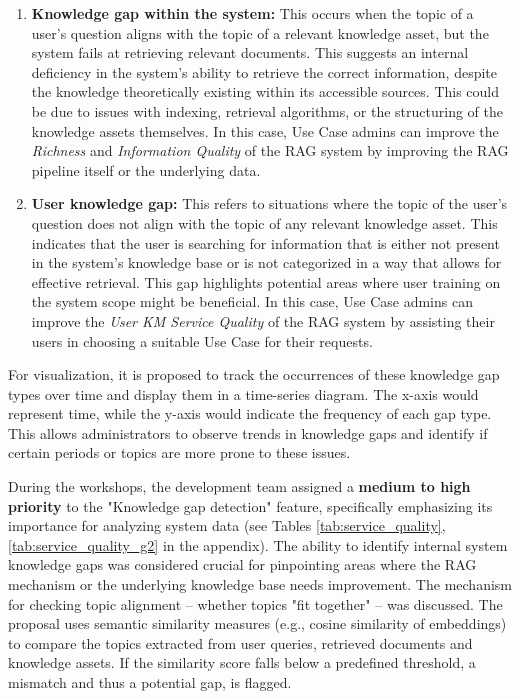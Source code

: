 \documentclass[
	english,
	ruledheaders=section,%
	class=report,%
	thesis={type=bachelor},%
	accentcolor=1b,%
	custommargins=true,%
	marginpar=false,%
	parskip=half-,%
	fontsize=11pt,%
	DIV=14,
]{tudapub}
\begin{document}
\begin{enumerate}
    \item \textbf{Knowledge gap within the system:} This occurs when the topic of a user's question aligns with the topic of a relevant knowledge asset, but the system fails at retrieving relevant documents. This suggests an internal deficiency in the system's ability to retrieve the correct information, despite the knowledge theoretically existing within its accessible sources. This could be due to issues with indexing, retrieval algorithms, or the structuring of the knowledge assets themselves. In this case, Use Case admins can improve the \textit{Richness} and \textit{Information Quality} \parencite[pp.~57--58]{Jennex2006} of the RAG system by improving the RAG pipeline itself or the underlying data.
    \item \textbf{User knowledge gap:} This refers to situations where the topic of the user's question does not align with the topic of any relevant knowledge asset. This indicates that the user is searching for information that is either not present in the system's knowledge base or is not categorized in a way that allows for effective retrieval. This gap highlights potential areas where user training on the system scope might be beneficial. In this case, Use Case admins can improve the \textit{User KM Service Quality} \parencite[pp.~58--59]{Jennex2006} of the RAG system by assisting their users in choosing a suitable Use Case for their requests.
\end{enumerate}

For visualization, it is proposed to track the occurrences of these knowledge gap types over time and display them in a time-series diagram. The x-axis would represent time, while the y-axis would indicate the frequency of each gap type. This allows administrators to observe trends in knowledge gaps and identify if certain periods or topics are more prone to these issues.

During the workshops, the development team assigned a \textbf{medium to high priority} to the "Knowledge gap detection" feature, specifically emphasizing its importance for analyzing system data (see Tables \ref{tab:service_quality}, \ref{tab:service_quality_g2} in the appendix). The ability to identify internal system knowledge gaps was considered crucial for pinpointing areas where the RAG mechanism or the underlying knowledge base needs improvement. The mechanism for checking topic alignment -- whether topics "fit together" -- was discussed. The proposal uses semantic similarity measures (e.g., cosine similarity of embeddings) to compare the topics extracted from user queries, retrieved documents and knowledge assets. If the similarity score falls below a predefined threshold, a mismatch and thus a potential gap, is flagged.
\end{document}
